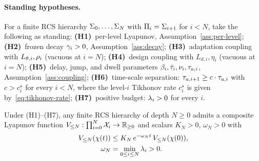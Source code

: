 \documentclass[conference]{IEEEtran}
\begin{document}
\paragraph{Standing hypotheses.}
For a finite RCS hierarchy $\Sigma_0, \ldots, \Sigma_N$ with
$\Pi_i = \Sigma_{i+1}$ for $i < N$, take the following as standing:
\textbf{(H1)}~per-level Lyapunov, Assumption~\ref{ass:per-level};
\textbf{(H2)}~frozen decay $\gamma_i > 0$, Assumption~\ref{ass:decay};
\textbf{(H3)}~adaptation coupling with $L_{\theta,i}, \rho_i$ (vacuous
at $i = N$);
\textbf{(H4)}~design coupling with $L_{d,i}, \eta_i$ (vacuous at $i = N$);
\textbf{(H5)}~delay, jump, and dwell parameters
$\beta_i, \taubar_i, \nu_i, \taua[i]$,
Assumption~\ref{ass:coupling};
\textbf{(H6)}~time-scale separation:
$\taua[i+1] \geq c \cdot \taua[i]$ with $c > c^\star_i$ for every
$i < N$, where the level-$i$ Tikhonov rate $c^\star_i$ is given
by~\eqref{eq:tikhonov-rate};
\textbf{(H7)}~positive budget: $\lambda_i > 0$ for every $i$.

\begin{theorem}
\label{thm:recursive}
Under (H1)--(H7), any finite RCS hierarchy of depth $N \geq 0$ admits a
composite Lyapunov function
$V_{\leq N}: \prod_{i=0}^{N} \mathcal{X}_i \to \mathbb{R}_{\geq 0}$ and scalars
$K_N > 0$, $\omega_N > 0$ with
\begin{align}
  V_{\leq N}(\chi(t))
    &\leq K_N\, e^{-\omega_N t}\, V_{\leq N}(\chi(0)), \\
  \omega_N &= \min_{0 \leq i \leq N} \lambda_i > 0.
\end{align}
\end{theorem}
\end{document}
